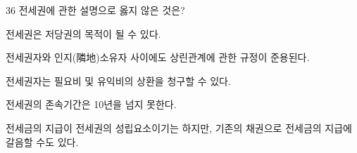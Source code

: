 \begin{question}{36}
전세권에 관한 설명으로 옳지 않은 것은?
\begin{choices}
  \item 전세권은 저당권의 목적이 될 수 있다.
  \item 전세권자와 인지(隣地)소유자 사이에도 상린관계에 관한 규정이 준용된다.
  \item 전세권자는 필요비 및 유익비의 상환을 청구할 수 있다.
  \item 전세권의 존속기간은 10년을 넘지 못한다.
  \item 전세금의 지급이 전세권의 성립요소이기는 하지만, 기존의 채권으로 전세금의 지급에 갈음할 수도 있다.
\end{choices}
\end{question}
